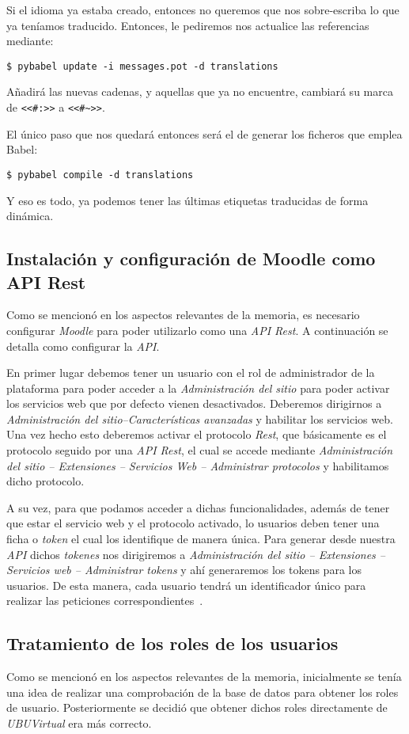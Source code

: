 Si el idioma ya estaba creado, entonces no queremos que nos sobre-escriba lo que ya teníamos traducido. Entonces, le pediremos nos actualice las referencias mediante:

\noindent\verb|$ pybabel update -i messages.pot -d translations|

Añadirá las nuevas cadenas, y aquellas que ya no encuentre, cambiará su marca de \texttt{<<\#:>>} a \texttt{<<\#\textasciitilde>>}.

El único paso que nos quedará entonces será el de generar los ficheros que emplea Babel:

\noindent\verb|$ pybabel compile -d translations|

Y eso es todo, ya podemos tener las últimas etiquetas traducidas de forma dinámica.

\subsection{Instalación y configuración de Moodle como API Rest}
Como se mencionó en los aspectos relevantes de la memoria, es necesario configurar \textit{Moodle} para poder utilizarlo como una \textit{API Rest}. A continuación se detalla como configurar la \textit{API}.

En primer lugar debemos tener un usuario con el rol de administrador de la plataforma para poder acceder a la \textit{Administración del sitio} para poder activar los servicios web que por defecto vienen desactivados. Deberemos dirigirnos a \textit{Administración del sitio--Características avanzadas} y habilitar los servicios web. Una vez hecho esto deberemos activar el protocolo \textit{Rest}, que básicamente es el protocolo seguido por una \textit{API Rest}, el cual se accede mediante \textit{Administración del sitio -- Extensiones -- Servicios Web -- Administrar protocolos} y habilitamos dicho protocolo.

A su vez, para que podamos acceder a dichas funcionalidades, además de tener que estar el servicio web y el protocolo activado, lo usuarios deben tener una ficha o \textit{token} el cual los identifique de manera única. Para generar desde nuestra \textit{API} dichos \textit{tokenes} nos dirigiremos a \textit{Administración del sitio -- Extensiones -- Servicios web -- Administrar tokens} y ahí generaremos los tokens para los usuarios. De esta manera, cada usuario tendrá un identificador único para realizar las peticiones correspondientes~\cite{moodle:api-rest-config}.

\subsection{Tratamiento de los roles de los usuarios}
Como se mencionó en los aspectos relevantes de la memoria, inicialmente se tenía una idea de realizar una comprobación de la base de datos para obtener los roles de usuario. Posteriormente se decidió que obtener dichos roles directamente de \textit{UBUVirtual} era más correcto.

